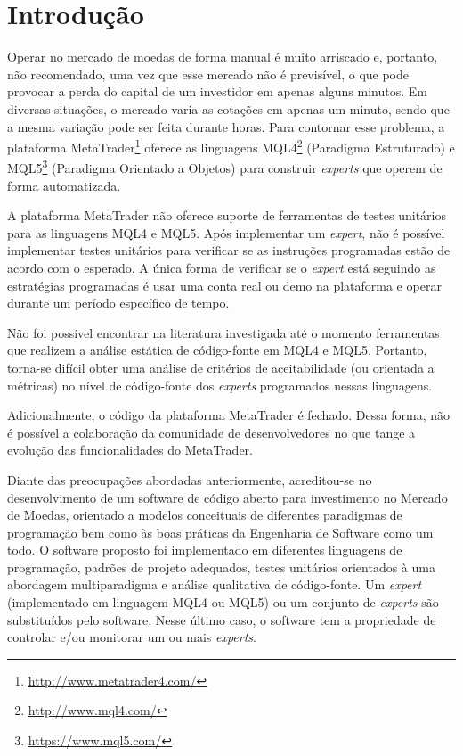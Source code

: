 \chapter{Introdução}

Operar no mercado de moedas de forma manual é muito arriscado e, portanto, não recomendado, uma vez que esse mercado não é previsível, o que pode provocar a perda do capital de um investidor em apenas alguns minutos. Em diversas situações, o mercado varia as cotações em apenas um minuto, sendo que a mesma variação pode ser feita durante horas. Para contornar esse problema, a plataforma MetaTrader\footnote{\url{http://www.metatrader4.com/}} oferece as linguagens MQL4\footnote{\url{http://www.mql4.com/}} (Paradigma Estruturado) e MQL5\footnote{\url{https://www.mql5.com/}} (Paradigma Orientado a Objetos) para construir \textit{experts} que operem de forma automatizada. 

A plataforma MetaTrader não oferece suporte de ferramentas de testes unitários para as linguagens MQL4 e MQL5. Após implementar um \textit{expert}, não é possível implementar testes unitários para verificar se as instruções programadas estão de acordo com o esperado. A única forma de verificar se o \textit{expert} está seguindo as estratégias programadas é usar uma conta real ou demo na plataforma e operar durante um período específico de tempo.

Não foi possível encontrar na literatura investigada até o momento ferramentas que realizem a análise estática de código-fonte em MQL4 e MQL5. Portanto, torna-se difícil obter uma análise de critérios de aceitabilidade (ou orientada a métricas) no nível de código-fonte dos \textit{experts} programados nessas linguagens.

Adicionalmente, o código da plataforma MetaTrader é fechado. Dessa forma, não é possível a colaboração da comunidade de desenvolvedores no que tange a evolução das funcionalidades do MetaTrader.

Diante das preocupações abordadas anteriormente, acreditou-se no desenvolvimento de um software de código aberto para investimento no Mercado de Moedas, orientado a modelos conceituais de diferentes paradigmas de programação bem como às boas práticas da Engenharia de Software como um todo. O software proposto foi implementado em diferentes linguagens de programação, padrões de projeto adequados, testes unitários orientados à uma abordagem multiparadigma e análise qualitativa de código-fonte. Um \textit{expert} (implementado em linguagem MQL4 ou MQL5) ou um conjunto de \textit{experts} são substituídos pelo software. Nesse último caso, o software tem a propriedade de controlar e/ou monitorar um ou mais \textit{experts}.

